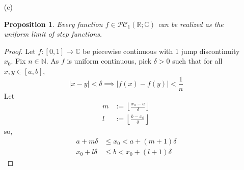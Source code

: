 \documentclass[12pt, reqno]{amsart}
\newtheorem{prop}{Proposition}[section]
\theoremstyle{definition}
\theoremstyle{remark}
\begin{document}
\begin{itemize}
\begin{itemize}
\begin{itemize}
\begin{proof}
If $k\ge N$,
\begin{align*}
|\hat f_{n}-\widehat{[g_{k}]}_{n}|&= |\widehat{[f-g_{k}]}_{n}\\
&\le \|f-g_{k}\|_{\infty}\\
&< \frac{\epsilon}{2}
\end{align*}
So, for $n\ge N$,
\begin{align*}
|\hat f_{n}|&= \left|\hat f_{n}-\widehat{[g_{N}]}_{n}+\widehat{[g_{N}]}_{n}\right|\\
&\le \left|\hat f_{n}-\widehat{[g_{N}]}_{n}\right|+\left|\widehat{[g_{N}]}_{n}\right|\\
&< \frac{\epsilon}{2}+ \frac{\epsilon}{2}\\
&= \epsilon
\end{align*}

\end{proof}

\end{itemize}

\vspace{0.1 cm}
\item[(c)] 

\begin{prop}
   Every function $f\in\mathcal{PC}_1(\mathbb{R;C})$ can be realized as the uniform limit of step functions.
\end{prop}

\begin{proof}
   Let $f:[0,1]\rightarrow \mathbb{C}$ be piecewise continuous with 1 jump discontinuity $x_{0}$. Fix $n\in \mathbb{N}$. As $f$ is uniform continuous, pick $\delta>0$ such that for all $x,y\in[a,b]$, $$|x-y|<\delta\implies |f(x)-f(y)|< \frac{1}{n}$$Let \begin{align}m&:=\left\lfloor \frac{x_{0}-a}{\delta}\right\rfloor\\ l&:=\left\lfloor \frac{b-x_{0}}{\delta}\right\rfloor\end{align}
so, \begin{align*}
a+m \delta&\le x_{0}<a+(m+1)\delta\\
x_{0}+l \delta&\le b<x_{0}+(l+1)\delta
\end{align*}


\end{proof}
\end{itemize}
\end{itemize}
\end{document}
